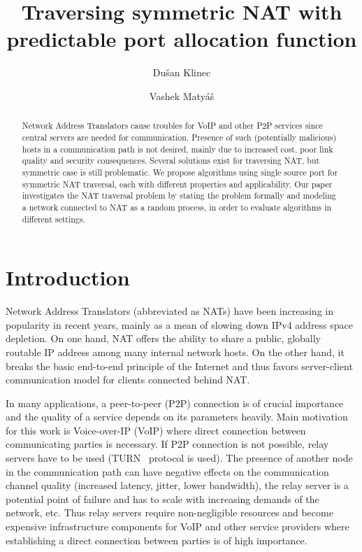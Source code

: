 \documentclass{llncs}
\title{\vspace{-15mm}%
	\fontsize{24pt}{10pt}\selectfont
	\textbf{Traversing symmetric NAT with predictable port allocation function}
	}
\author{Du\v{s}an Klinec \and Vashek Matyáš}
\institute{Faculty of Informatics, Masaryk University, Brno, Czech Republic\\
\email{\{xklinec,matyas\}@fi.muni.cz}}
\begin{document}
\maketitle

\begin{abstract}
\noindent Network Address Translators cause troubles for VoIP and other P2P services since central servers are needed for communication.
Presence of such (potentially malicious) hosts in a communication path is not desired, mainly due to increased cost, poor link quality 
and security consequences.
Several solutions exist for traversing NAT, but symmetric case is still problematic. We propose algorithms using single source port for 
symmetric NAT traversal, each with different properties and applicability. 
Our paper investigates the NAT traversal problem by stating the problem formally and modeling a network connected to 
NAT as a random process, in order to evaluate algorithms in different settings.
\end{abstract}
	


\section{Introduction}
Network Address Translators (abbreviated as NATs) have been increasing in popularity in recent years, 
mainly as a mean of slowing down IPv4 address space depletion. On one hand, NAT offers
the ability to share a public, globally routable IP address among many internal network hosts. On 
the other hand, it breaks the basic end-to-end principle of the Internet and thus favors server-client 
communication model for clients connected behind NAT.

In many applications, a peer-to-peer (P2P) connection is of crucial importance and the quality of a service depends on 
its parameters heavily. Main motivation for this work is Voice-over-IP (VoIP) where direct connection 
between communicating parties is necessary. If P2P connection is not possible, relay 
servers have to be used (TURN~\citep{rfc5766} protocol is used). The presence 
of another node in the communication path can have negative effects on the communication channel quality 
(increased latency, jitter, lower bandwidth), the relay server is a potential point of failure and 
has to scale with increasing demands of the network, etc.
Thus relay servers require non-negligible resources and become expensive infrastructure components for VoIP and other service providers where establishing a direct connection between parties is of high importance.
\end{document}
